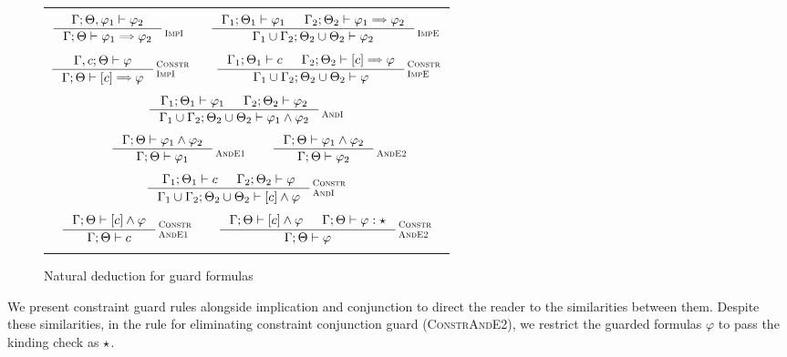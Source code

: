 \documentclass[english, mgr]{iithesis}
\renewcommand{\sc}[1]{\textsc{\small{#1}}}
\newcommand{\scbrk}[2]{\myatop{\textsc{#1}}{\textsc{#2}}}
\begin{document}
\begin{figure}[htbp]
  \centering
  \begin{tabularx}{\textwidth}{|C|}
  \hline \\ $
  \inference{
    \jgmnt[\cEnv;\Theta,\formphi_1]{\formphi_2}
  }{
    \jgmnt[\cEnv;\Theta]{\formphi_1 \fImp \formphi_2}
  }\scbrk{}{ImpI}
  \qquad
  \inference{
    \jgmnt[\cEnv_1;\Theta_1]{\formphi_1} &
    \jgmnt[\cEnv_2;\Theta_2]{\formphi_1 \fImp \formphi_2}
    }{
    \jgmnt[\cEnv_1 \cup \cEnv_2;\Theta_2 \cup \Theta_2]{\formphi_2}
  }\scbrk{}{ImpE}
  $ \\ \\ $
  \inference{
    \jgmnt[\cEnv, \constr;\Theta]{\formphi}
  }{
    \jgmnt[\cEnv;\Theta]{\fCImp{\constr}\formphi}
  }\scbrk{Constr}{ImpI}
  \qquad
  \inference{
    \jgmnt[\cEnv_1;\Theta_1]{\constr} &
    \jgmnt[\cEnv_2;\Theta_2]{\fCImp{\constr}\formphi}
    }{
    \jgmnt[\cEnv_1 \cup \cEnv_2;\Theta_2 \cup \Theta_2]{\formphi}
  }\scbrk{Constr}{ImpE}
  $ \\ \\ $
  \inference{
    \jgmnt[\cEnv_1;\Theta_1]{\formphi_1} &
    \jgmnt[\cEnv_2;\Theta_2]{\formphi_2}
  }{
    \jgmnt[\cEnv_1 \cup \cEnv_2;\Theta_2 \cup \Theta_2]{\formphi_1 \wedge \formphi_2}
  }\scbrk{}{AndI}
  $ \\ \\ $
  \qquad
  \inference{
    \jgmnt[\cEnv;\Theta]{\formphi_1 \wedge \formphi_2}
    }{
    \jgmnt[\cEnv;\Theta]{\formphi_1}
  }\scbrk{}{AndE1}\qquad
  \inference{
    \jgmnt[\cEnv;\Theta]{\formphi_1 \wedge \formphi_2}
    }{
    \jgmnt[\cEnv;\Theta]{\formphi_2}
  }\scbrk{}{AndE2}
  $ \\ \\ $
  \inference{
    \jgmnt[\cEnv_1;\Theta_1]{\constr} &
    \jgmnt[\cEnv_2;\Theta_2]{\formphi}
  }{
    \jgmnt[\cEnv_1 \cup \cEnv_2;\Theta_2 \cup \Theta_2]{\fCAnd{\constr}\formphi}
  }\scbrk{Constr}{AndI}
  $ \\ \\ $
  \inference{
    \jgmnt[\cEnv;\Theta]{\fCAnd{\constr}\formphi}
    }{
    \jgmnt[\cEnv;\Theta]{\constr}
  }\scbrk{Constr}{AndE1}\qquad
  \inference{
    \jgmnt[\cEnv;\Theta]{\fCAnd{\constr}\formphi} &
    \jgmnt[\cEnv;\Theta]{\formphi: \kProp}
    }{
    \jgmnt[\cEnv;\Theta]{\formphi}
  }\scbrk{Constr}{AndE2}
  $ \\ \\ \hline
  \end{tabularx}
  \caption{Natural deduction for guard formulas}
  \label{fig:deduction}
\end{figure}
We present constraint guard rules alongside implication and conjunction
to direct the reader to the similarities between them.
Despite these similarities,
in the rule for eliminating constraint conjunction guard (\sc{ConstrAndE2}),
we restrict the guarded formulas $\varphi$ to pass the kinding check as $\star$.
\end{document}
